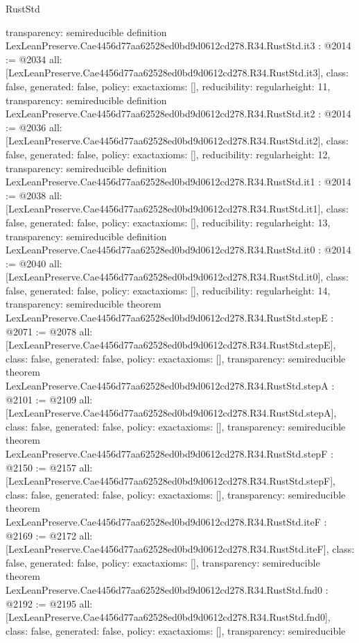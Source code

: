 \begin{lexlean}{RustStd}
\begin{coremodule}
{  transparency: semireducible
}
definition LexLeanPreserve.Cae4456d77aa62528ed0bd9d0612cd278.R34.RustStd.it3 : @2014 := @2034 {
  all: [LexLeanPreserve.Cae4456d77aa62528ed0bd9d0612cd278.R34.RustStd.it3],
  class: false,
  generated: false,
  policy: exact{axioms: []},
  reducibility: regular{height: 11},
  transparency: semireducible
}
definition LexLeanPreserve.Cae4456d77aa62528ed0bd9d0612cd278.R34.RustStd.it2 : @2014 := @2036 {
  all: [LexLeanPreserve.Cae4456d77aa62528ed0bd9d0612cd278.R34.RustStd.it2],
  class: false,
  generated: false,
  policy: exact{axioms: []},
  reducibility: regular{height: 12},
  transparency: semireducible
}
definition LexLeanPreserve.Cae4456d77aa62528ed0bd9d0612cd278.R34.RustStd.it1 : @2014 := @2038 {
  all: [LexLeanPreserve.Cae4456d77aa62528ed0bd9d0612cd278.R34.RustStd.it1],
  class: false,
  generated: false,
  policy: exact{axioms: []},
  reducibility: regular{height: 13},
  transparency: semireducible
}
definition LexLeanPreserve.Cae4456d77aa62528ed0bd9d0612cd278.R34.RustStd.it0 : @2014 := @2040 {
  all: [LexLeanPreserve.Cae4456d77aa62528ed0bd9d0612cd278.R34.RustStd.it0],
  class: false,
  generated: false,
  policy: exact{axioms: []},
  reducibility: regular{height: 14},
  transparency: semireducible
}
theorem LexLeanPreserve.Cae4456d77aa62528ed0bd9d0612cd278.R34.RustStd.stepE : @2071 := @2078 {
  all: [LexLeanPreserve.Cae4456d77aa62528ed0bd9d0612cd278.R34.RustStd.stepE],
  class: false,
  generated: false,
  policy: exact{axioms: []},
  transparency: semireducible
}
theorem LexLeanPreserve.Cae4456d77aa62528ed0bd9d0612cd278.R34.RustStd.stepA : @2101 := @2109 {
  all: [LexLeanPreserve.Cae4456d77aa62528ed0bd9d0612cd278.R34.RustStd.stepA],
  class: false,
  generated: false,
  policy: exact{axioms: []},
  transparency: semireducible
}
theorem LexLeanPreserve.Cae4456d77aa62528ed0bd9d0612cd278.R34.RustStd.stepF : @2150 := @2157 {
  all: [LexLeanPreserve.Cae4456d77aa62528ed0bd9d0612cd278.R34.RustStd.stepF],
  class: false,
  generated: false,
  policy: exact{axioms: []},
  transparency: semireducible
}
theorem LexLeanPreserve.Cae4456d77aa62528ed0bd9d0612cd278.R34.RustStd.iteF : @2169 := @2172 {
  all: [LexLeanPreserve.Cae4456d77aa62528ed0bd9d0612cd278.R34.RustStd.iteF],
  class: false,
  generated: false,
  policy: exact{axioms: []},
  transparency: semireducible
}
theorem LexLeanPreserve.Cae4456d77aa62528ed0bd9d0612cd278.R34.RustStd.fnd0 : @2192 := @2195 {
  all: [LexLeanPreserve.Cae4456d77aa62528ed0bd9d0612cd278.R34.RustStd.fnd0],
  class: false,
  generated: false,
  policy: exact{axioms: []},
  transparency: semireducible
}
\end{coremodule}
\end{lexlean}
